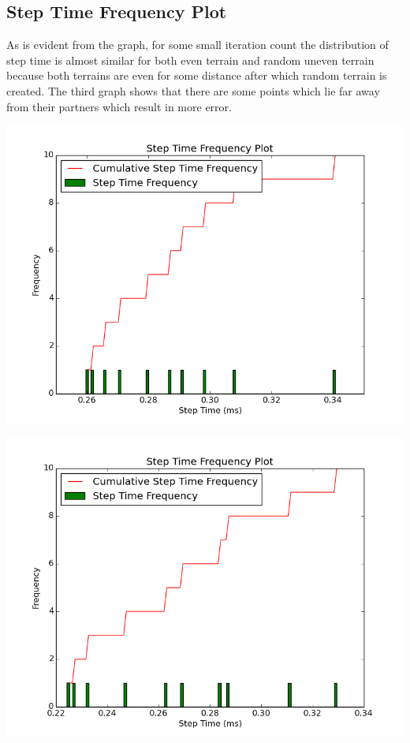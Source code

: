 \documentclass[11pt]{article}
\begin{document}
	\subsection{Step Time Frequency Plot} 
	As is evident from the graph, for some small iteration count the distribution of step time is almost similar for both even terrain and random uneven terrain 
	because both terrains are even for some distance after which random terrain is created. The third graph shows that there are some points which lie far away 
	from their partners which result in more error.
	\begin{center}
	  \includegraphics[scale=0.5]{images/g26_plot03_150x10_even}
	\end{center}
	\begin{center}
	  \includegraphics[scale=0.5]{images/g26_plot03_1500x10_random}
	\end{center}
\end{document}
